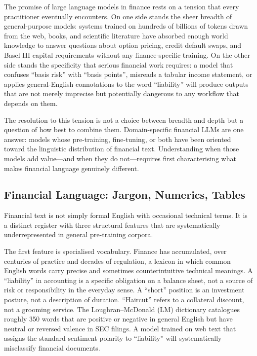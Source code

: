 \begin{context}
The promise of large language models in finance rests on a tension that every
practitioner eventually encounters.  On one side stands the sheer breadth of
general-purpose models: systems trained on hundreds of billions of tokens drawn
from the web, books, and scientific literature have absorbed enough world knowledge
to answer questions about option pricing, credit default swaps, and Basel III
capital requirements without any finance-specific training.  On the other side
stands the specificity that serious financial work requires: a model that confuses
``basis risk'' with ``basis points'', misreads a tabular income statement, or
applies general-English connotations to the word ``liability'' will produce
outputs that are not merely imprecise but potentially dangerous to any workflow
that depends on them.

The resolution to this tension is not a choice between breadth and depth but a
question of how best to combine them.  Domain-specific financial LLMs are one
answer: models whose pre-training, fine-tuning, or both have been oriented
toward the linguistic distribution of financial text.  Understanding when those
models add value---and when they do not---requires first characterising what
makes financial language genuinely different.
\end{context}

\subsection{Financial Language: Jargon, Numerics, Tables}
\label{sec:ch08-financial-language}

Financial text is not simply formal English with occasional technical terms.
It is a distinct register with three structural features that are systematically
underrepresented in general pre-training corpora.

The first feature is specialised vocabulary.  Finance has accumulated, over
centuries of practice and decades of regulation, a lexicon in which common
English words carry precise and sometimes counterintuitive technical meanings.
A ``liability'' in accounting is a specific obligation on a balance sheet, not
a source of risk or responsibility in the everyday sense.  A ``short'' position
is an investment posture, not a description of duration.  ``Haircut'' refers to
a collateral discount, not a grooming service.  The Loughran--McDonald (LM)
dictionary \cite{loughran2011liability} catalogues roughly 350 words that are
positive or negative in general English but have neutral or reversed valence in
SEC filings.  A model trained on web text that assigns the standard sentiment
polarity to ``liability'' will systematically misclassify financial documents.

